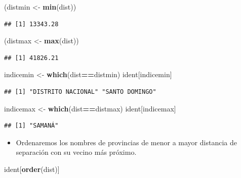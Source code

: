 \documentclass[11pt,]{article}
\newenvironment{Shaded}{\begin{snugshade}}{\end{snugshade}}
\newcommand{\KeywordTok}[1]{\textcolor[rgb]{0.13,0.29,0.53}{\textbf{#1}}}
\newcommand{\StringTok}[1]{\textcolor[rgb]{0.31,0.60,0.02}{#1}}
\newcommand{\OperatorTok}[1]{\textcolor[rgb]{0.81,0.36,0.00}{\textbf{#1}}}
\newcommand{\NormalTok}[1]{#1}
\providecommand{\tightlist}{%
\setlength{\itemsep}{0pt}\setlength{\parskip}{0pt}}
\begin{document}
\begin{Shaded}
\begin{Highlighting}[]
\NormalTok{(distmin <-}\StringTok{ }\KeywordTok{min}\NormalTok{(dist)) }
\end{Highlighting}
\end{Shaded}

\begin{verbatim}
## [1] 13343.28
\end{verbatim}

\begin{Shaded}
\begin{Highlighting}[]
\NormalTok{(distmax <-}\StringTok{ }\KeywordTok{max}\NormalTok{(dist))}
\end{Highlighting}
\end{Shaded}

\begin{verbatim}
## [1] 41826.21
\end{verbatim}

\begin{Shaded}
\begin{Highlighting}[]
\NormalTok{indicemin <-}\StringTok{ }\KeywordTok{which}\NormalTok{(dist}\OperatorTok{==}\NormalTok{distmin)}
\NormalTok{ident[indicemin]}
\end{Highlighting}
\end{Shaded}

\begin{verbatim}
## [1] "DISTRITO NACIONAL" "SANTO DOMINGO"
\end{verbatim}

\begin{Shaded}
\begin{Highlighting}[]
\NormalTok{indicemax <-}\StringTok{ }\KeywordTok{which}\NormalTok{(dist}\OperatorTok{==}\NormalTok{distmax)}
\NormalTok{ident[indicemax]}
\end{Highlighting}
\end{Shaded}

\begin{verbatim}
## [1] "SAMANÁ"
\end{verbatim}

\begin{itemize}
\tightlist
\item
  Ordenaremos los nombres de provincias de menor a mayor distancia de
  separación con su vecino más próximo.
\end{itemize}

\begin{Shaded}
\begin{Highlighting}[]
\NormalTok{ident[}\KeywordTok{order}\NormalTok{(dist)]}
\end{Highlighting}
\end{Shaded}
\end{document}

